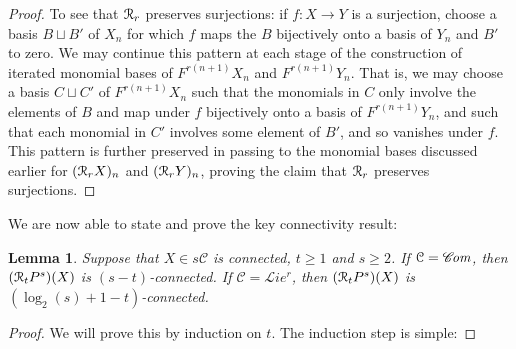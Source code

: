 \documentclass[11pt]{amsart} \renewcommand{\baselinestretch}{1.2}
\theoremstyle{plain}
\newtheorem{lem}[thm]{Lemma}
\numberwithin{equation}{section} %
\theoremstyle{plain}
\newtheorem{lem}[thm]{Lemma}
\numberwithin{equation}{chapter} %
\renewcommand{\to}{\longrightarrow}
\newcommand{\scrL}{\mathscr{L}}
\newcommand{\scrC}{\mathscr{C}}
\newcommand{\calR}{\mathcal{R}}
\newcommand{\calc}{\mathcal{C}}
\newcommand{\algs}{{\scrC\!\textit{\normalfont\textit{om}}}}
\newcommand{\restliealgs}{{\scrL\!\textit{ie}^\textit{r}}}
\newcommand{\algcat}{{\calc}}%
\newcommand{\caldup}[1]{\calR_{\smash{#1}}}
\newcommand{\barConstructionMightAbbreviate}{b}
\begin{document}
\begin{Bousfield-Kan spectral sequence}
\begin{proof}
To see that $\caldup{r}$ preserves surjections: if $f:X\to Y$ is a surjection, choose a basis $B\sqcup B'$ of $X_n$ for  which $f$ maps the $B$ bijectively onto a basis of $Y_n$ and $B'$ to zero. We may continue this pattern at each stage of the construction of iterated monomial bases of $F^{r(n+1)}X_n$ and $F^{r(n+1)}Y_n$. That is, we may choose a  basis $C\sqcup C'$ of $F^{r(n+1)}X_n$  such that the monomials in $C$ only involve the elements of $B$ and map under $f$ bijectively onto a basis of $F^{r(n+1)}Y_n$, and such that each monomial in $C'$ involves some element of $B'$, and so vanishes under $f$. This pattern is further preserved in passing to the monomial bases discussed earlier for $(\caldup{r}X)_n$ and $(\caldup{r}Y)_n$, proving the claim that $\caldup{r}$ preserves surjections. 
%
%
\end{proof}
We are now able to state and prove the key connectivity result:
\begin{lem}
\label{connectivityOfDerivedPowers}
Suppose that $X\in s\algcat$ is connected, $t\geq1$ and $s\geq2$. If $\algcat=\algs$, then $(\caldup{t}P^{s})(X)$ is $(s-t)$-connected. If $\algcat=\restliealgs$, then $(\caldup{t}P^{s})(X)$ is  $(\log_2(s)+1-t)$-connected.
\end{lem}
\begin{proof}
We will prove this by induction on $t$. The induction step is simple: %

\end{proof}
\end{Bousfield-Kan spectral sequence}
\end{document}
